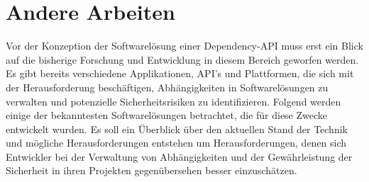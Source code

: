 \section{Andere Arbeiten} \label{sec:Andere}
Vor der Konzeption der Softwarelösung einer Dependency-API muss erst ein Blick auf die bisherige Forschung und Entwicklung in diesem Bereich geworfen werden.
Es gibt bereits verschiedene Applikationen, API's und Plattformen, die sich mit der Herausforderung beschäftigen, Abhängigkeiten in Softwarelösungen zu verwalten und potenzielle Sicherheitsrisiken zu identifizieren.
Folgend werden einige der bekanntesten Softwarelösungen betrachtet, die für diese Zwecke entwickelt wurden.
Es soll ein Überblick über den aktuellen Stand der Technik und mögliche Herausforderungen entstehen um Herausforderungen, denen sich Entwickler bei der Verwaltung von Abhängigkeiten und der Gewährleistung der Sicherheit in ihren Projekten gegenübersehen besser einzuschätzen.




